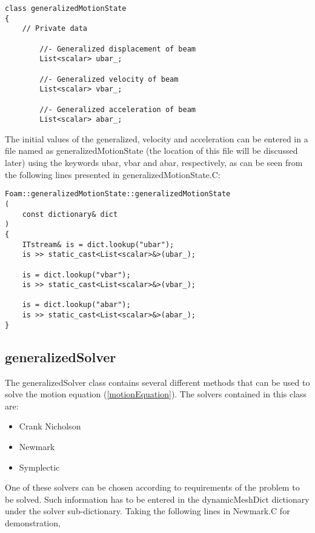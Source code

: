 \begin{lstlisting}
class generalizedMotionState
{
    // Private data

        //- Generalized displacement of beam
        List<scalar> ubar_;

        //- Generalized velocity of beam
        List<scalar> vbar_;

        //- Generalized acceleration of beam
        List<scalar> abar_;
\end{lstlisting}

\noindent The initial values of the generalized, velocity and acceleration can be entered in a file named as generalizedMotionState (the location of this file will be discussed later) using the keywords ubar, vbar and abar, respectively, as can be seen from the following lines presented in generalizedMotionState.C:

\begin{lstlisting}
Foam::generalizedMotionState::generalizedMotionState
(
    const dictionary& dict
)
{
    ITstream& is = dict.lookup("ubar");
    is >> static_cast<List<scalar>&>(ubar_);

    is = dict.lookup("vbar");
    is >> static_cast<List<scalar>&>(vbar_);

    is = dict.lookup("abar");
    is >> static_cast<List<scalar>&>(abar_);
}
\end{lstlisting}

\subsection{generalizedSolver}

The generalizedSolver class contains several different methods that can be used to solve the motion equation (\ref{motionEquation}). The solvers contained in this class are:

\begin{itemize}

\item Crank Nicholson
\item Newmark
\item Symplectic

\end{itemize}

\noindent  One of these solvers can be chosen according to requirements of the problem to be solved. Such information has to be entered in the dynamicMeshDict dictionary under the solver sub-dictionary. Taking the following lines in Newmark.C for demonstration, 

